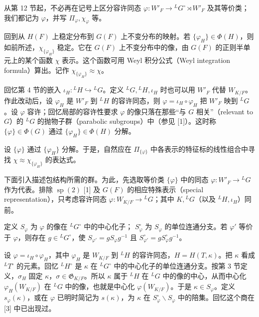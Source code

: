 从第 12 节起，不必再在记号上区分容许同态
$\varphi:W'_F\to{}^LG^\circ\rtimes W'_F$ 及其等价类；我们都记为 $\varphi$，并写 $\Pi_\varphi,\chi_\varphi$ 等。

回到从 $H(F)$ 上稳定分布到 $G(F)$ 上不变分布的映射。若
$\{\varphi_H\}\in\Phi(H)$，则如前所述，$\chi_{\{\varphi_H\}}$ 稳定。它在 $G(F)$ 上不变分布中的像，由 $G(F)$ 的正则半单元上的某个函数 $\chi$ 表示。这个函数可用 Weyl 积分公式（Weyl integration formula）算出。记作 $\chi_{\{\varphi_H\}}\approx\chi$。

回忆第 4 节的嵌入 $\iota_H:{}^LH\hookrightarrow{}^LG$。定义
${}^LG,{}^LH,\iota_H$ 时也可以用 $W'_F$ 代替 $W_{K/F}$。作此改动后，设 $\varphi_H$ 是 $W'_F$ 到 ${}^LH$ 的容许同态，则
$\varphi=\iota_H\circ\varphi_H$ 把 $W'_F$ 映到 ${}^LG$。设 $\varphi$ 容许；回忆局部的容许性要求 $\varphi$ 的像只落在那些“与 $G$ 相关”（relevant to $G$）的 ${}^LG$ 的抛物子群（parabolic subgroups）中（参见 [1]）。这时称 $\{\varphi\}\in\Phi(G)$ 通过
$\{\varphi_H\}\in\Phi(H)$ 分解。

设 $\{\varphi\}$ 通过 $\{\varphi_H\}$ 分解。于是，自然应在 $\Pi_{\{\varphi\}}$ 中各表示的特征标的线性组合中寻找 $\chi\approx\chi_{\{\varphi_H\}}$ 的表达式。

下面引入描述包结构所需的群。为此，先选取等价类 $\{\varphi\}$ 中的同态
$\varphi:W'_F\to{}^LG$ 作为代表。排除 $\operatorname{sp}(2)$ [1] 及 $G(F)$ 的相应特殊表示（special representation），只考虑容许同态
$\varphi:W_{K/F}\to{}^LG$；其中 $K,{}^LG$（以及 ${}^LH,\iota_H$）同前。

定义 $S_\varphi$ 为 $\varphi$ 的像在 ${}^LG^\circ$ 中的中心化子；
$S_\varphi^\circ$ 为 $S_\varphi$ 的单位连通分支。若 $\varphi'$ 等价于 $\varphi$，则存在 $g\in{}^LG^\circ$，使
$S_{\varphi'}=gS_\varphi g^{-1}$ 且
$S_{\varphi'}^\circ=gS_\varphi^\circ g^{-1}$。

设 $\varphi=\iota_H\circ\varphi_H$，其中 $\varphi_H$ 是 $W_{K/F}$ 到 ${}^LH$ 的容许同态，$H=H(T,\kappa)$。把 $\kappa$ 看成 ${}^LT^\circ$ 的元素。回忆 ${}^LH^\circ$ 是 $\kappa$ 在 ${}^LG^\circ$ 中的中心化子的单位连通分支。按第 3 节定义，$\sigma_H$ 固定 $\kappa$，$\sigma\in\mathfrak G_{K/F}$。所以 $\kappa$ 属于 ${}^LH$ 在 ${}^LG$ 中的像的中心，从而中心化 $\varphi_H(W_{K/F})$ 在 ${}^LG$ 中的像，也就是中心化 $\varphi(W_{K/F})$。于是 $\kappa\in S_\varphi$。定义 $s_\varphi(\kappa)$，或在 $\varphi$ 已明时简记为 $s(\kappa)$，为 $\kappa$ 在
$S_\varphi^\circ\backslash S_\varphi$ 中的陪集。回忆这个商在 [3] 中已出现过。

